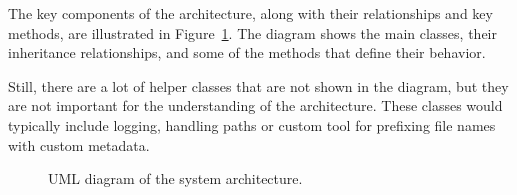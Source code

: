 The key components of the architecture, along with their relationships and key methods, are illustrated in Figure~\ref{fig:uml_diagram}.
The diagram shows the main classes, their inheritance relationships, and some of the methods that define their behavior.

Still, there are a lot of helper classes that are not shown in the diagram, but they are not important for the understanding of the architecture.
These classes would typically include logging, handling paths or custom tool for prefixing file names with custom metadata.

\begin{figure}[ht]
    \centering
    \scalebox{1}{
        
    }
    \vspace{15pt}
    \caption{UML diagram of the system architecture.}
    \label{fig:uml_diagram}
\end{figure}